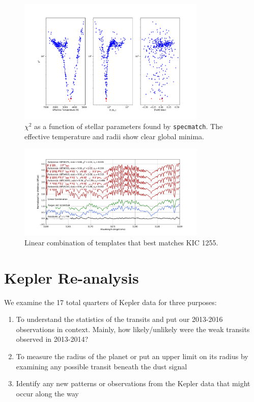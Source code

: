 \documentclass[preprint]{aastex61}
\begin{document}
\begin{figure}[!hbtp]
\begin{centering}
\includegraphics[width=0.8\textwidth]{images/subaru/spec_chi_min.pdf}
\caption{$\chi^2$ as a function of stellar parameters found by \texttt{specmatch}.
The effective temperature and radii show clear global minima.}\label{fig:specMatch}
\end{centering}
\end{figure}

\begin{figure}[!hbtp]
\begin{centering}
\includegraphics[width=0.8\textwidth]{images/subaru/lincomb_kic1255.pdf}
\caption{Linear combination of templates that best matches KIC 1255.}\label{fig:specMatch}
\end{centering}
\end{figure}



\clearpage

\section{Kepler Re-analysis}
We examine the 17 total quarters of Kepler data for three purposes:
\begin{enumerate}
	\item To understand the statistics of the transits and put our 2013-2016 observations in context. Mainly, how likely/unlikely were the weak transits observed in 2013-2014?
	\item To measure the radius of the planet or put an upper limit on its radius by examining any possible transit beneath the dust signal
	\item Identify any new patterns or observations from the Kepler data that might occur along the way
\end{enumerate}
\end{document}
